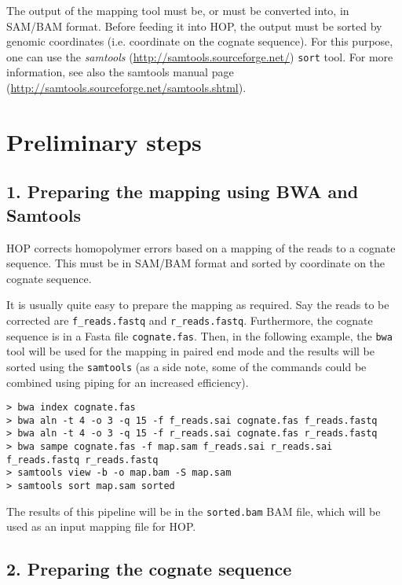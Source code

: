 \documentclass[12pt,titlepage]{article}
\newcommand{\Hop}{{HOP}\xspace}
\begin{document}
The output of the mapping tool must be, or must be converted into,
in SAM/BAM format. Before feeding it into \Hop, the output must be sorted
by genomic coordinates (i.e. coordinate on the cognate sequence).
For this purpose, one can use
the \textit{samtools} (\url{http://samtools.sourceforge.net/}) \texttt{sort}
tool. For more information, see also the samtools manual page
(\url{http://samtools.sourceforge.net/samtools.shtml}).

\section{Preliminary steps}

\subsection{1. Preparing the mapping using BWA and Samtools}

\Hop corrects homopolymer errors based on a mapping of the reads to a
cognate sequence. This must be in SAM/BAM format and sorted by coordinate
on the cognate sequence.

It is usually quite easy to prepare the mapping as required.
Say the reads to be corrected are \texttt{f\_reads.fastq} and
\texttt{r\_reads.fastq}. Furthermore, the cognate sequence
is in a Fasta file \texttt{cognate.fas}. Then, in the following
example, the \texttt{bwa} tool will be used for the mapping in paired end mode
and the results will be sorted using the \texttt{samtools}
(as a side note, some of the commands could be combined using piping for an
increased efficiency).

\begin{footnotesize}
\begin{verbatim}
> bwa index cognate.fas
> bwa aln -t 4 -o 3 -q 15 -f f_reads.sai cognate.fas f_reads.fastq
> bwa aln -t 4 -o 3 -q 15 -f r_reads.sai cognate.fas r_reads.fastq
> bwa sampe cognate.fas -f map.sam f_reads.sai r_reads.sai f_reads.fastq r_reads.fastq
> samtools view -b -o map.bam -S map.sam
> samtools sort map.sam sorted
\end{verbatim}
\end{footnotesize}

The results of this pipeline will be in the \texttt{sorted.bam} BAM file,
which will be used as an input mapping file for \Hop.

\subsection{2. Preparing the cognate sequence}
\end{document}
